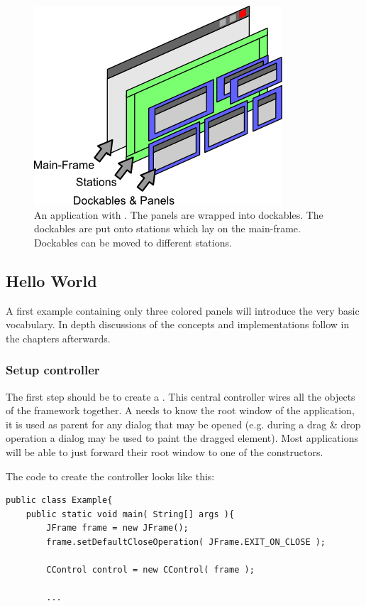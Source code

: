 \begin{figure}[ht]
\centering
\includegraphics[scale=1]{basics/app_with}
\caption{An application with . The panels are wrapped into dockables. The dockables are put onto stations which lay on the main-frame. Dockables can be moved to different stations.}
\label{fig:app_with}
\end{figure}

\subsection{Hello World}
A first example containing only three colored panels will introduce the very basic vocabulary. In depth discussions of the concepts and implementations follow in the chapters afterwards.

\subsubsection{Setup controller}
The first step should be to create a . This central controller wires all the objects of the framework together. A  needs to know the root window of the application, it is used as parent for any dialog that may be opened (e.g. during a drag \& drop operation a dialog may be used to paint the dragged element). Most applications will be able to just forward their root window to one of the constructors.

The code to create the controller looks like this:
\begin{lstlisting}
public class Example{
	public static void main( String[] args ){
		JFrame frame = new JFrame();
		frame.setDefaultCloseOperation( JFrame.EXIT_ON_CLOSE );
		
		CControl control = new CControl( frame );
		
		...
\end{lstlisting}

